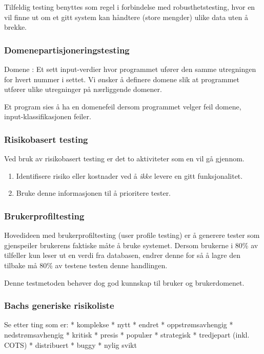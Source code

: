 Tilfeldig testing benyttes som regel i forbindelse med
robusthetstesting, hvor en vil finne ut om et gitt system kan håndtere
(store mengder) ulike data uten å brekke.

\subsubsection{Domenepartisjoneringstesting}

Domene : Et sett input-verdier hvor programmet ufører den samme
utregningen for hvert nummer i settet. Vi ønsker å definere domene slik
at programmet utfører ulike utregninger på nærliggende domener.

Et program sies å ha en domenefeil dersom programmet velger feil domene,
input-klassifikasjonen feiler.

\subsubsection{Risikobasert testing}

Ved bruk av risikobasert testing er det to aktiviteter som en vil gå
gjennom.

\begin{enumerate}[1.]
\item
  Identifisere risiko eller kostnader ved å \emph{ikke} levere en gitt
  funksjonalitet.
\item
  Bruke denne informasjonen til å prioritere tester.
\end{enumerate}
\subsubsection{Brukerprofiltesting}

Hovedideen med brukerprofiltesting (user profile testing) er å generere
tester som gjenspeiler brukerens faktiske måte å bruke systemet. Dersom
brukerne i 80\% av tilfeller kun leser ut en verdi fra databasen, endrer
denne for så å lagre den tilbake må 80\% av testene testen denne
handlingen.

Denne testmetoden behøver dog god kunnskap til bruker og brukerdomenet.

\subsubsection{Bachs generiske risikoliste}

Se etter ting som er: * komplekse * nytt * endret * oppstrømsavhengig *
nedstrømsavhengig * kritisk * presis * populær * strategisk * tredjepart
(inkl. COTS) * distribuert * buggy * nylig svikt

